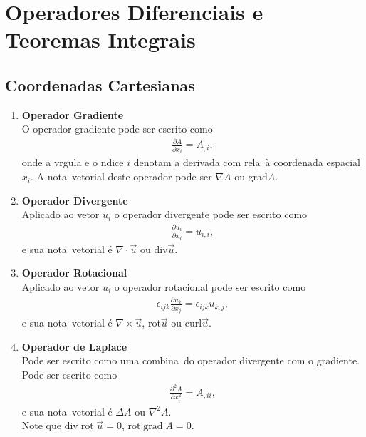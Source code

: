 
\section{Operadores Diferenciais e Teoremas Integrais }

\subsection {Coordenadas Cartesianas}

\begin{enumerate}

\item {\bf Operador Gradiente}\\
O operador gradiente pode ser escrito como
\begin{eqnarray}
\frac{\partial A}{\partial x_{i}} = A_{,i},
\end{eqnarray}
onde a v\ih rgula e o \ih ndice $i$ denotam a derivada com
rela\cao\ \`a coordenada espacial $x_{i}$. A nota\cao\ vetorial
deste operador pode ser $\nabla A$ ou grad$A$.

\item {\bf Operador Divergente}\\
Aplicado ao vetor $u_{i}$ o operador divergente pode ser escrito
como
\begin{eqnarray}
\frac{\partial u_{i}}{\partial x_{i}} = u_{i,i},
\end{eqnarray}
e sua nota\cao\ vetorial \'e $\nabla\!\cdot\!\vec{u}$ ou div$\vec{u}$.

\item {\bf Operador Rotacional}\\
Aplicado ao vetor $u_{i}$ o operador rotacional pode ser escrito
como
\begin{eqnarray}
\epsilon_{ijk}\frac{\partial u_{k}}{\partial x_{j}} =
\epsilon_{ijk}u_{k,j},
\end{eqnarray}
e sua nota\cao\ vetorial \'e $\nabla\!\times\!\vec{u}$, rot$\vec{u}$ ou
curl$\vec{u}$.

\item {\bf Operador de Laplace}\\
Pode ser escrito como uma combina\cao\ do operador divergente com
o gradiente. Pode ser escrito como
\begin{eqnarray}
\frac{\partial^{2}A}{\partial x_{i}^{2}} = A_{,ii},
\end{eqnarray}
e sua nota\cao\ vetorial \'e $\Delta A$ ou $\nabla^{2}A$.
\\

Note que $\mbox{div}\;\mbox{rot}\;\vec{u} = 0$, $\mbox{rot}\;\mbox{grad}\; A = 0$.


\end{enumerate}
